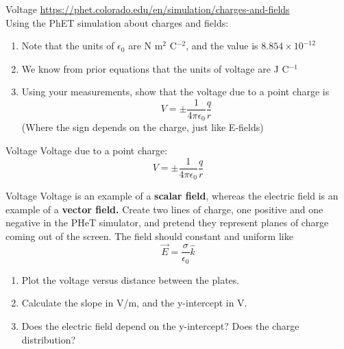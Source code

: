 \documentclass{beamer}
\begin{document}
\begin{frame}{Voltage}
\url{https://phet.colorado.edu/en/simulation/charges-and-fields} \\
\alert{Using the PhET simulation about charges and fields}:
\begin{enumerate}
\item Note that the units of $\epsilon_0$ are N m$^2$ C$^{-2}$, and the value is $8.854\times 10^{-12}$
\item We know from prior equations that the units of voltage are J C$^{-1}$
\item Using your measurements, show that the voltage due to a point charge is
\begin{equation}
\boxed{
V = \pm \frac{1}{4\pi \epsilon_0} \frac{q}{r}}
\end{equation}
(Where the sign depends on the charge, just like E-fields)
\end{enumerate}
\end{frame}

\begin{frame}{Voltage}
Voltage due to a point charge:
\begin{equation}
\boxed{
V = \pm \frac{1}{4\pi \epsilon_0} \frac{q}{r}} \label{eq:volt2}
\end{equation}
\end{frame}

\begin{frame}{Voltage}
Voltage is an example of a \textbf{scalar field}, whereas the electric field is an example of a \textbf{vector field.}  Create two lines of charge, one positive and one negative in the PHeT simulator, and pretend they represent planes of charge coming out of the screen.  The field should constant and uniform like
\begin{equation}
\vec{E} = \frac{\sigma}{\epsilon_0} \hat{k}
\end{equation}
\begin{enumerate}
\item Plot the voltage versus distance between the plates.
\item Calculate the slope in V/m, and the y-intercept in V.
\item Does the electric field depend on the y-intercept?  Does the charge distribution?
\end{enumerate}
\end{frame}
\end{document}
